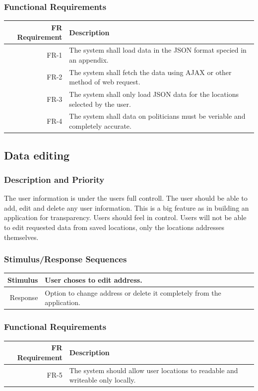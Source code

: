 \documentclass[12pt,oneside,letterpaper]{article}
\begin{document}
\subsubsection{Functional Requirements}
\begin{longtable}{|r|p{3.8in}|}
\hline
FR Requirement & Description \\
\hline
FR-1 & The system shall load data in the JSON format specied in an appendix. \\
\hline
FR-2 & The system shall fetch the data using AJAX or other method of web request. \\
\hline
FR-3 & The system shall only load JSON data for the locations
selected by the user. \\
\hline
FR-4 &The system shall data on politicians must be veriable and
completely accurate.\\
\hline
\end{longtable}

\subsection{Data editing}
\subsubsection{Description and Priority}
The user information is under the users full controll. The user should be able to add, edit and delete any user information. This is a big feature as in building an application for transparency. Users should feel in control. Users will not be able to edit requested data from saved locations, only the locations addresses themselves.
\subsubsection{Stimulus/Response Sequences}
\begin{longtable}{|r|p{3.8in}|}
\hline
Stimulus & User choses to edit address. \\
\hline
Response & Option to change address or delete it completely from the application. \\
\hline
\end{longtable}
\subsubsection{Functional Requirements}
\begin{longtable}{|r|p{3.8in}|}
\hline
FR Requirement & Description \\
\hline
FR-5 & The system should allow user locations to readable and writeable only locally. \\
\hline
\end{longtable}
\end{document}

